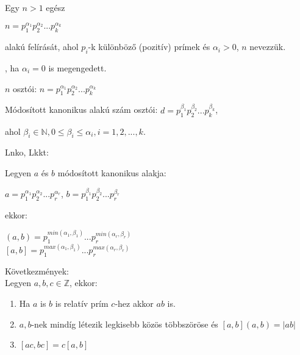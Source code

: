 \begin{frame}
  \begin{tcolorbox}[title={Def.: Kanonikus alak, Módosított kanonikus alak}]
    Egy $n > 1$ egész\\
    \mmedskip

    $n = p_1^{{\alpha_1}}p_2^{{\alpha_2}}...p_k^{{\alpha_k}}$\\
    \mmedskip

    alakú felírását, ahol $p_i$-k különböző (pozitív) prímek és ${\alpha}_i > 0$, $n$  nevezzük.\\
    \mmedskip

    , ha ${\alpha}_i = 0$ is megengedett.
  \end{tcolorbox}

  \begin{tcolorbox}[title={Ész}]
    $n$ osztói: $n = p_1^{{\alpha_1}}p_2^{{\alpha_2}}...p_k^{{\alpha_k}}$\\
    \mmedskip

    Módosított kanonikus alakú szám osztói: $d = p_1^{{\beta}_1}p_2^{{\beta}_2}...p_k^{{\beta}_k}$,\\
    \msmallskip
    
    ahol ${\beta}_i \in \mathbb{N}, 0 \leq {\beta}_i \leq {\alpha}_i, i = 1, 2, ..., k$.\\
    \mmedskip

    Lnko, Lkkt:\\
    \mmedskip

    Legyen $a$ és $b$ módosított kanonikus alakja:\\
    \msmallskip
    
    $a = p_1^{{\alpha}_1}p_2^{{\alpha}_2}...p_r^{{\alpha}_r}$, $b = p_1^{{\beta}_1}p_2^{{\beta}_2}...p_r^{{\beta}_r}$\\
    \mmedskip

    ekkor:\\
    \msmallskip
    
    $(a, b) = p_1^{min({\alpha}_1, {\beta}_1)}...p_r^{min({\alpha}_r, {\beta}_r)}$\\
    $[a, b] = p_1^{max({\alpha}_1, {\beta}_1)}...p_r^{max({\alpha}_r, {\beta}_r)}$\\
    \mbigskip

    Következmények:\\
    Legyen $a, b, c \in \mathbb{Z}$, ekkor:\\
    \begin{enumerate}
      \item Ha $a$ is $b$ is relatív prím $c$-hez akkor $ab$ is.
      \item $a, b$-nek mindíg létezik legkisebb közös többszöröse és $[a, b](a, b) = |ab|$
      \item $[ac, bc] = c[a, b]$
    \end{enumerate}
  \end{tcolorbox}
\end{frame}

